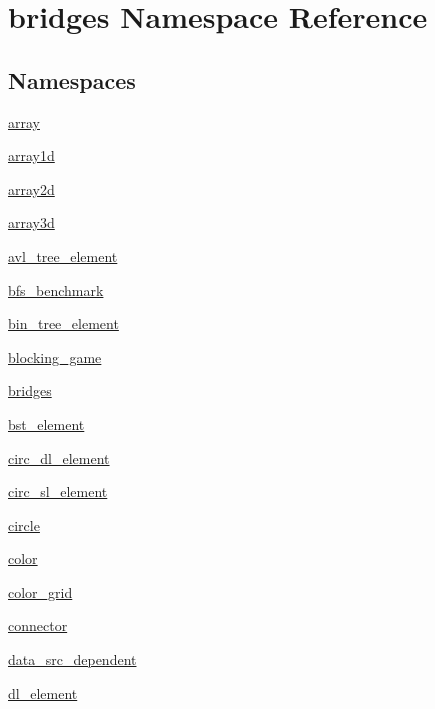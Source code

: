 \hypertarget{namespacebridges}{}\section{bridges Namespace Reference}
\label{namespacebridges}
\subsection*{Namespaces}
\begin{DoxyCompactItemize}
\item 
 \mbox{\hyperlink{namespacebridges_1_1array}{array}}
\item 
 \mbox{\hyperlink{namespacebridges_1_1array1d}{array1d}}
\item 
 \mbox{\hyperlink{namespacebridges_1_1array2d}{array2d}}
\item 
 \mbox{\hyperlink{namespacebridges_1_1array3d}{array3d}}
\item 
 \mbox{\hyperlink{namespacebridges_1_1avl__tree__element}{avl\+\_\+tree\+\_\+element}}
\item 
 \mbox{\hyperlink{namespacebridges_1_1bfs__benchmark}{bfs\+\_\+benchmark}}
\item 
 \mbox{\hyperlink{namespacebridges_1_1bin__tree__element}{bin\+\_\+tree\+\_\+element}}
\item 
 \mbox{\hyperlink{namespacebridges_1_1blocking__game}{blocking\+\_\+game}}
\item 
 \mbox{\hyperlink{namespacebridges_1_1bridges}{bridges}}
\item 
 \mbox{\hyperlink{namespacebridges_1_1bst__element}{bst\+\_\+element}}
\item 
 \mbox{\hyperlink{namespacebridges_1_1circ__dl__element}{circ\+\_\+dl\+\_\+element}}
\item 
 \mbox{\hyperlink{namespacebridges_1_1circ__sl__element}{circ\+\_\+sl\+\_\+element}}
\item 
 \mbox{\hyperlink{namespacebridges_1_1circle}{circle}}
\item 
 \mbox{\hyperlink{namespacebridges_1_1color}{color}}
\item 
 \mbox{\hyperlink{namespacebridges_1_1color__grid}{color\+\_\+grid}}
\item 
 \mbox{\hyperlink{namespacebridges_1_1connector}{connector}}
\item 
 \mbox{\hyperlink{namespacebridges_1_1data__src__dependent}{data\+\_\+src\+\_\+dependent}}
\item 
 \mbox{\hyperlink{namespacebridges_1_1dl__element}{dl\+\_\+element}}

\end{DoxyCompactItemize}
